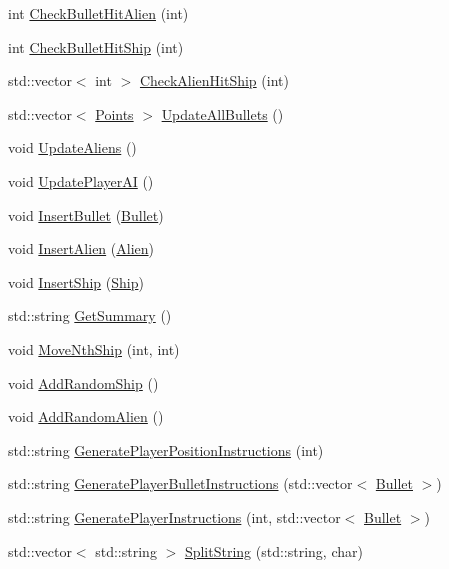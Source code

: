 \begin{DoxyCompactItemize}
\item 
int \hyperlink{classBoard_a429eee3494a6d2f0537a9090d8234e7c}{Check\-Bullet\-Hit\-Alien} (int)
\item 
int \hyperlink{classBoard_a54db8325f1f8469ed203d2a7d92173e0}{Check\-Bullet\-Hit\-Ship} (int)
\item 
std\-::vector$<$ int $>$ \hyperlink{classBoard_a4283790d3df6d888690636b3c18a62a0}{Check\-Alien\-Hit\-Ship} (int)
\item 
std\-::vector$<$ \hyperlink{structPoints}{Points} $>$ \hyperlink{classBoard_af2b83842c75c0488aa75912af5f9f07e}{Update\-All\-Bullets} ()
\item 
void \hyperlink{classBoard_adf79371ed66ad81dd8b9460aab8e6922}{Update\-Aliens} ()
\item 
void \hyperlink{classBoard_a55cc3abed148d96fe26d0f7c2c3c1455}{Update\-Player\-A\-I} ()
\item 
void \hyperlink{classBoard_ac01669380d6bbbfee220022159b590c5}{Insert\-Bullet} (\hyperlink{classBullet}{Bullet})
\item 
void \hyperlink{classBoard_a024eae78fe11e03519d5c0ef58d85db9}{Insert\-Alien} (\hyperlink{classAlien}{Alien})
\item 
void \hyperlink{classBoard_a7111111e66c4989f48e65eb81631a3ec}{Insert\-Ship} (\hyperlink{classShip}{Ship})
\item 
std\-::string \hyperlink{classBoard_aa3b61b2239e47ef8b15f6f9f0786b429}{Get\-Summary} ()
\item 
void \hyperlink{classBoard_afa34ba5e5fb7a536f3a7c7d0f4bfec49}{Move\-Nth\-Ship} (int, int)
\item 
void \hyperlink{classBoard_a3d99b005b1f99ccd1def4a702f45f244}{Add\-Random\-Ship} ()
\item 
void \hyperlink{classBoard_afcdb74fa821b0e6aa1218499175b2f15}{Add\-Random\-Alien} ()
\item 
std\-::string \hyperlink{classBoard_ad5828fd8bee3079d81f95612c0273617}{Generate\-Player\-Position\-Instructions} (int)
\item 
std\-::string \hyperlink{classBoard_a28c5886e943bfc4685dee86fead69178}{Generate\-Player\-Bullet\-Instructions} (std\-::vector$<$ \hyperlink{classBullet}{Bullet} $>$)
\item 
std\-::string \hyperlink{classBoard_a2d715bf1632a90386ec3ecd97b2a48d5}{Generate\-Player\-Instructions} (int, std\-::vector$<$ \hyperlink{classBullet}{Bullet} $>$)
\item 
std\-::vector$<$ std\-::string $>$ \hyperlink{classBoard_ab8caeb07fc238bfd70accf256986eadc}{Split\-String} (std\-::string, char)

\end{DoxyCompactItemize}
